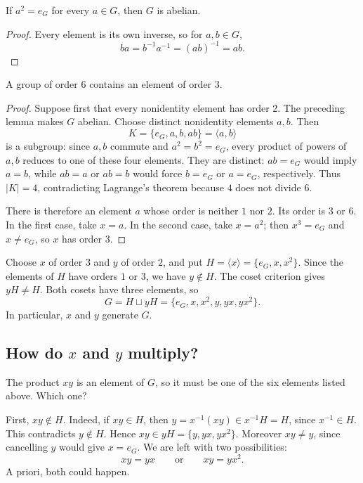 \documentclass[reqno,11pt]{amsart}
\begin{document}
\begin{lemma}
If $a^2=e_G$ for every $a\in G$, then $G$ is abelian.
\end{lemma}
\begin{proof}
Every element is its own inverse, so for $a,b\in G$,
\[
  ba=b^{-1}a^{-1}=(ab)^{-1}=ab.
\]
\end{proof}

\begin{proposition}
A group of order $6$ contains an element of order $3$.
\end{proposition}
\begin{proof}
Suppose first that every nonidentity element has order $2$.
The preceding lemma makes $G$ abelian. Choose distinct nonidentity
elements $a,b$. Then
\[
  K=\{e_G,a,b,ab\}=\langle a,b\rangle
\]
is a subgroup: since $a,b$ commute and $a^2=b^2=e_G$, every product of
powers of $a,b$ reduces to one of these four elements. They are distinct:
$ab=e_G$ would imply $a=b$, while $ab=a$ or $ab=b$ would force $b=e_G$
or $a=e_G$, respectively. Thus $|K|=4$, contradicting Lagrange's theorem
because $4$ does not divide $6$.

There is therefore an element $a$ whose order is neither $1$ nor $2$.
Its order is $3$ or $6$. In the first case, take $x=a$.
In the second case, take $x=a^2$; then $x^3=e_G$ and $x\neq e_G$, so
$x$ has order $3$.
\end{proof}

Choose $x$ of order $3$ and $y$ of order $2$, and put
$H=\langle x\rangle=\{e_G,x,x^2\}$. Since the elements of $H$ have
orders $1$ or $3$, we have $y\notin H$. The coset criterion gives
$yH\neq H$. Both cosets have three elements, so
\begin{equation}
  G=H\sqcup yH=\{e_G,x,x^2,y,yx,yx^2\}.
\end{equation}
In particular, $x$ and $y$ generate $G$.
\subsection*{How do \texorpdfstring{$x$}{x} and \texorpdfstring{$y$}{y} multiply?}
The product $xy$ is an element of $G$, so it must be one of the six
elements listed above. Which one?

First, $xy\notin H$. Indeed, if $xy\in H$, then
$y=x^{-1}(xy)\in x^{-1}H=H$, since $x^{-1}\in H$. This contradicts
$y\notin H$. Hence $xy\in yH=\{y,yx,yx^2\}$. Moreover $xy\neq y$, since
cancelling $y$ would give $x=e_G$. We are left with two possibilities:
\begin{equation}\label{eq:two-cases}
  xy=yx\qquad\text{or}\qquad xy=yx^2.
\end{equation}
A priori, both could happen.
\end{document}
